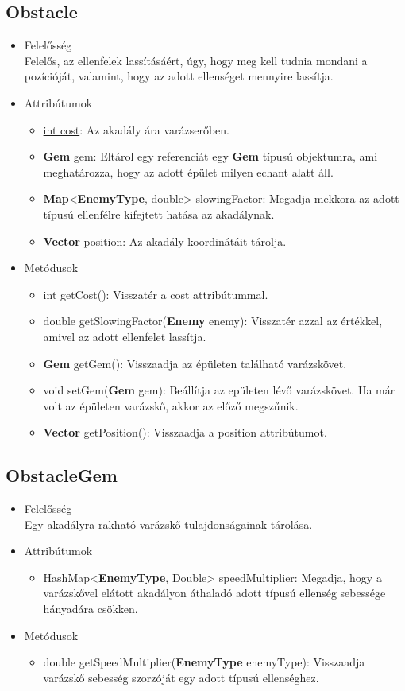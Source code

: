 \subsection{Obstacle}
\begin{itemize}
\item Felelősség\\
Felelős, az ellenfelek lassításáért, úgy, hogy meg kell tudnia mondani a pozícióját, valamint, hogy az adott ellenséget mennyire lassítja.
\item Attribútumok
	\begin{itemize}
		\item \underline{int cost}: Az akadály ára varázserőben.
		\item \textbf{Gem} gem: Eltárol egy referenciát egy \textbf{Gem} típusú objektumra, ami meghatározza, hogy az adott épület milyen echant alatt áll.
		\item \textbf{Map}<\textbf{EnemyType}, double> slowingFactor: Megadja mekkora az adott típusú ellenfélre kifejtett hatása az akadálynak.
		\item \textbf{Vector} position: Az akadály koordinátáit tárolja.
	\end{itemize}
\item Metódusok
	\begin{itemize}
		\item int getCost(): Visszatér a cost attribútummal.
		\item double getSlowingFactor(\textbf{Enemy} enemy): Visszatér azzal az értékkel, amivel az adott ellenfelet lassítja.
		\item \textbf{Gem} getGem(): Visszaadja az épületen található varázskövet.
		\item void setGem(\textbf{Gem} gem): Beállítja az epületen lévő varázskövet. Ha már volt az épületen varázskő, akkor az előző megszűnik.
		\item \textbf{Vector} getPosition(): Visszaadja a position attribútumot.
	\end{itemize}
\end{itemize}


\subsection{ObstacleGem}
\begin{itemize}
\item Felelősség\\
Egy akadályra rakható varázskő tulajdonságainak tárolása.
\item Attribútumok
	\begin{itemize}
		\item HashMap<\textbf{EnemyType}, Double> speedMultiplier: Megadja, hogy a varázskővel elátott akadályon áthaladó adott típusú ellenség sebessége hányadára csökken.
	\end{itemize}
\item Metódusok
	\begin{itemize}
		\item double getSpeedMultiplier(\textbf{EnemyType} enemyType): Visszaadja varázskő sebesség szorzóját egy adott típusú ellenséghez.
	\end{itemize}
\end{itemize}


